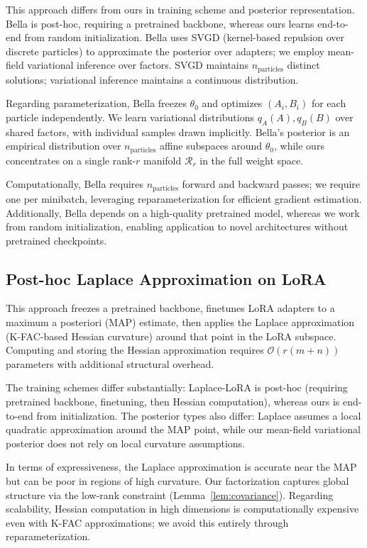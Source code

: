 \documentclass{article}
\theoremstyle{plain}
\theoremstyle{definition}
\theoremstyle{remark}
\begin{document}
This approach differs from ours in training scheme and posterior representation. Bella is post-hoc, requiring a pretrained backbone, whereas ours learns end-to-end from random initialization. Bella uses SVGD (kernel-based repulsion over discrete particles) to approximate the posterior over adapters; we employ mean-field variational inference over factors. SVGD maintains $n_{\text{particles}}$ distinct solutions; variational inference maintains a continuous distribution.

Regarding parameterization, Bella freezes $\theta_0$ and optimizes $(A_i, B_i)$ for each particle independently. We learn variational distributions $q_A(A), q_B(B)$ over shared factors, with individual samples drawn implicitly. Bella's posterior is an empirical distribution over $n_{\text{particles}}$ affine subspaces around $\theta_0$, while ours concentrates on a single rank-$r$ manifold $\mathcal{R}_r$ in the full weight space.

Computationally, Bella requires $n_{\text{particles}}$ forward and backward passes; we require one per minibatch, leveraging reparameterization for efficient gradient estimation. Additionally, Bella depends on a high-quality pretrained model, whereas we work from random initialization, enabling application to novel architectures without pretrained checkpoints.

\subsection{Post-hoc Laplace Approximation on LoRA \cite{yang2024bayesian_lora}}

This approach freezes a pretrained backbone, finetunes LoRA adapters to a maximum a posteriori (MAP) estimate, then applies the Laplace approximation (K-FAC-based Hessian curvature) around that point in the LoRA subspace. Computing and storing the Hessian approximation requires $\mathcal{O}(r(m+n))$ parameters with additional structural overhead.

The training schemes differ substantially: Laplace-LoRA is post-hoc (requiring pretrained backbone, finetuning, then Hessian computation), whereas ours is end-to-end from initialization. The posterior types also differ: Laplace assumes a local quadratic approximation around the MAP point, while our mean-field variational posterior does not rely on local curvature assumptions.

In terms of expressiveness, the Laplace approximation is accurate near the MAP but can be poor in regions of high curvature. Our factorization captures global structure via the low-rank constraint (Lemma~\ref{lem:covariance}). Regarding scalability, Hessian computation in high dimensions is computationally expensive even with K-FAC approximations; we avoid this entirely through reparameterization.
\end{document}
